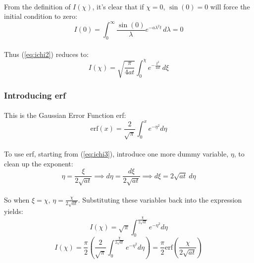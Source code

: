 \paragraph{}
From the definition of $I(\chi)$, it's clear that if $\chi=0$, $\sin(0) = 0$ will force the initial condition to zero:
\begin{equation*}
I(0) = \int_{0}^{\infty} \frac{\sin(0)}{\lambda} e^{-a \lambda^2 t} \, d\lambda = 0
\end{equation*}
\paragraph{}
Thus (\ref{eq:ichi2}) reduces to:
\begin{equation}
\label{eq:ichi3}
I(\chi) = \sqrt{\frac{\pi}{4at}} \int_{0}^{\chi} e^{-\frac{\xi^2}{4 a t}} \, d\xi
\end{equation}

\subsubsection*{Introducing erf}
\paragraph{}
This is the Gaussian Error Function erf:
\begin{equation}
\label{eq:erf}
\text{erf}(x) = \frac{2}{\sqrt\pi}\int_{0}^{x} e^{-\eta^2} d\eta
\end{equation}
\paragraph{}
To use erf, starting from (\ref{eq:ichi3}), introduce one more dummy variable, $\eta$, to clean up the exponent:
\begin{equation*}
\eta = \frac{\xi}{2\sqrt{a t}} \implies d\eta = \frac{d\xi}{2\sqrt{a t}} \implies d\xi = 2\sqrt{a t} \ d\eta
\end{equation*}
\paragraph{}
So when $\xi = \chi$, $\eta = \frac{\chi}{2\sqrt{at}}$. Substituting these variables back into the expression yields:
\begin{equation*}
I(\chi) = \sqrt{\pi} \int_{0}^{\frac{\chi}{2\sqrt{at}}} e^{-\eta^2} d\eta
\end{equation*}
\begin{equation*}
I(\chi) = \frac{\pi}{2} \left( \frac{2}{\sqrt{\pi}} \int_{0}^{\frac{\chi}{2\sqrt{at}}} e^{-\eta^2} d\eta \right) = \frac{\pi}{2} \text{erf}\left(\frac{\chi}{2\sqrt{a t}}\right)
\end{equation*}
